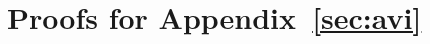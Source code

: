 \documentclass[11pt, notitlepage]{article}
\newcommand{\1}{\mathbbm{1}}
\begin{document}
    
    
    



    



























    
    
    
    




    
    
    
    
    













\section{Proofs for Appendix~\ref{sec:avi}}
\end{document}
